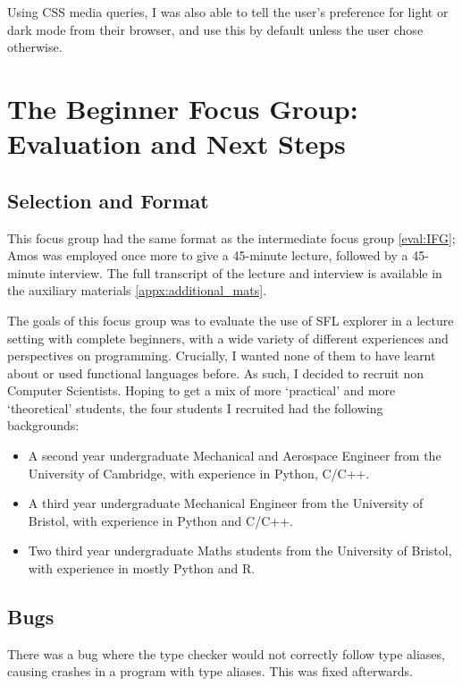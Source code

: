 Using CSS media queries, I was also able to tell the user's preference for light or dark mode from their browser, and use this by default unless the user chose otherwise. 


\section{The Beginner Focus Group: Evaluation and Next Steps}
\label{eval:BFG}
\subsection{Selection and Format}
This focus group had the same format as the intermediate focus group \ref{eval:IFG}; Amos was employed once more to give a 45-minute lecture, followed by a 45-minute interview. The full transcript of the lecture and interview is available in the auxiliary materials \ref{appx:additional_mats}.

The goals of this focus group was to evaluate the use of SFL explorer in a lecture setting with complete beginners, with a wide variety of different experiences and perspectives on programming. Crucially, I wanted none of them to have learnt about or used functional languages before. As such, I decided to recruit non Computer Scientists. Hoping to get a mix of more `practical' and more `theoretical' students, the four students I recruited had the following backgrounds:

\begin{itemize}
    \item A second year undergraduate Mechanical and Aerospace Engineer from the University of Cambridge, with experience in Python, C/C++.
    \item A third year undergraduate Mechanical Engineer from the University of Bristol, with experience in Python and C/C++.
    \item Two third year undergraduate Maths students from the University of Bristol, with experience in mostly Python and R.
\end{itemize}

\subsection{Bugs}
There was a bug where the type checker would not correctly follow type aliases, causing crashes in a program with type aliases. This was fixed afterwards. 

